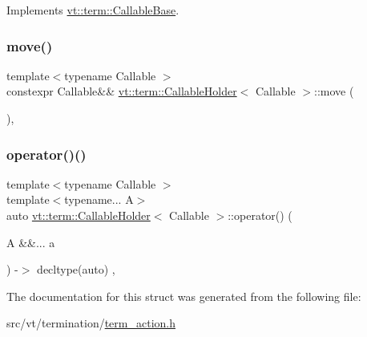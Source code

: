 Implements \hyperlink{structvt_1_1term_1_1_callable_base_a534f470aaf4dd168faa9adf3c91e6ca2}{vt\+::term\+::\+Callable\+Base}.

\mbox{\label{structvt_1_1term_1_1_callable_holder_a9a1517406276e39c5a5c140196ea7ccf}} 
\subsubsection{\texorpdfstring{move()}{move()}}
{\footnotesize\ttfamily template$<$typename Callable $>$ \\
constexpr Callable\&\& \hyperlink{structvt_1_1term_1_1_callable_holder}{vt\+::term\+::\+Callable\+Holder}$<$ Callable $>$\+::move (\begin{DoxyParamCaption}{ }\end{DoxyParamCaption})\hspace{0.3cm}{\ttfamily [inline]}, {\ttfamily [protected]}}

\mbox{\label{structvt_1_1term_1_1_callable_holder_a4cf06b82cc1a80a9070f77de9841957f}} 
\subsubsection{\texorpdfstring{operator()()}{operator()()}}
{\footnotesize\ttfamily template$<$typename Callable $>$ \\
template$<$typename... A$>$ \\
auto \hyperlink{structvt_1_1term_1_1_callable_holder}{vt\+::term\+::\+Callable\+Holder}$<$ Callable $>$\+::operator() (\begin{DoxyParamCaption}\item[{A \&\&...}]{a }\end{DoxyParamCaption}) -\/$>$ decltype(auto) \hspace{0.3cm}{\ttfamily [inline]}, {\ttfamily [protected]}}



The documentation for this struct was generated from the following file\+:\begin{DoxyCompactItemize}
\item 
src/vt/termination/\hyperlink{term__action_8h}{term\+\_\+action.\+h}\end{DoxyCompactItemize}
